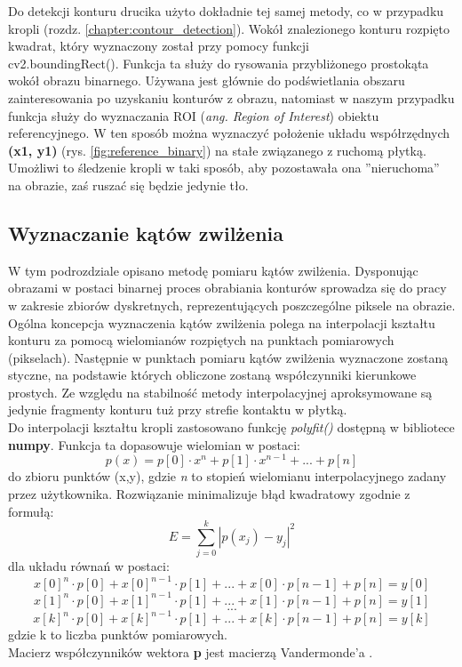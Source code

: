 \documentclass[a4paper,11pt,twoside,openright]{article} %
\begin{document}
\vspace{5mm}
\noindent Do detekcji konturu drucika użyto dokładnie tej samej metody, co w przypadku kropli (rozdz. \ref{chapter:contour_detection}). Wokół znalezionego konturu rozpięto kwadrat, który wyznaczony został przy pomocy funkcji \\cv2.boundingRect(). Funkcja ta służy do rysowania przybliżonego prostokąta wokół obrazu binarnego. Używana jest głównie do podświetlania obszaru zainteresowania po uzyskaniu konturów z obrazu, natomiast w naszym przypadku funkcja służy do wyznaczania ROI (\textit{ang. Region of Interest}) obiektu referencyjnego. W ten sposób można wyznaczyć położenie układu współrzędnych \textbf{(x1, y1)} (rys. \ref{fig:reference_binary}) na stałe związanego z ruchomą płytką. Umożliwi to śledzenie kropli w taki sposób, aby pozostawała ona ''nieruchoma'' na obrazie, zaś ruszać się będzie jedynie tło.

\subsection{Wyznaczanie kątów zwilżenia}
\noindent W tym podrozdziale opisano metodę pomiaru kątów zwilżenia. Dysponując obrazami w postaci binarnej proces obrabiania konturów sprowadza się do pracy w zakresie zbiorów dyskretnych, reprezentujących poszczególne piksele na obrazie. Ogólna koncepcja wyznaczenia kątów zwilżenia polega na interpolacji kształtu konturu za pomocą wielomianów rozpiętych na punktach pomiarowych (pikselach). Następnie w punktach pomiaru kątów zwilżenia wyznaczone zostaną styczne, na podstawie których obliczone zostaną współczynniki kierunkowe prostych. Ze względu na stabilność metody interpolacyjnej aproksymowane są jedynie fragmenty konturu tuż przy strefie kontaktu w płytką. \\
\noindent Do interpolacji kształtu kropli zastosowano funkcję \textit{polyfit()} dostępną w bibliotece \textbf{numpy}. Funkcja ta dopasowuje wielomian w postaci:
$$p(x) = p[0] \cdot x^{n} + p[1] \cdot x^{n-1} + ... + p[n]$$
\noindent do zbioru punktów (x,y), gdzie \textit{n} to stopień wielomianu interpolacyjnego zadany przez użytkownika. Rozwiązanie minimalizuje błąd kwadratowy zgodnie z formułą:
$$E = \sum_{j=0}^{k} |p(x_j) - y_j|^2$$
\newpage
\noindent dla układu równań w postaci:
$$x[0]^n \cdot p[0] +  x[0]^{n-1} \cdot p[1] + ... + x[0]\cdot p[n-1] + p[n] = y[0]$$
$$x[1]^n \cdot p[0] +  x[1]^{n-1} \cdot p[1] + ... + x[1]\cdot p[n-1] + p[n] = y[1]$$
$$...$$
$$x[k]^n \cdot p[0] +  x[k]^{n-1} \cdot p[1] + ... + x[k]\cdot p[n-1] + p[n] = y[k]$$
\noindent gdzie k to liczba punktów pomiarowych.\\
\noindent Macierz współczynników wektora \textbf{p} jest macierzą Vandermonde'a \cite{ALGEBRA}.\\\\
\end{document}
